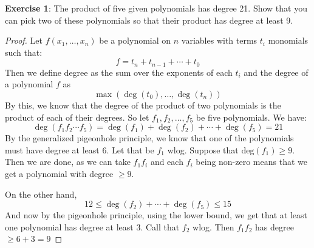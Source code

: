 \documentclass{article}
\begin{document}
\textbf{Exercise 1}: The product of five given polynomials has degree 21. Show that you can pick two of these polynomials so that their product has degree at least 9.
    \begin{proof}
        Let $f(x_{1}, \ldots , x_{n})$ be a polynomial on $n$ variables with terms $t_{i}$ monomials such that:
            \begin{equation*}
                f = t_{n} + t_{n - 1} + \cdots +t_{0}
            \end{equation*}
        Then we define degree as the sum over the exponents of each $t_{i}$ and the degree of a polynomial $f$ as
            \begin{equation*}
                \max(\mathop{deg}(t_{0}), \ldots , \mathop{deg}(t_{n}))
            \end{equation*}
        By this, we know that the degree of the product of two polynomials is the product of each of their degrees. So let $f_{1}, f_{2}, \ldots , f_{5}$ be five polynomials. We have:
            \begin{equation*}
                \mathop{deg}(f_{1}f_{2}\cdots f_{5}) = \mathop{deg}(f_{1}) + \mathop{deg}(f_{2})  + \cdots + \mathop{deg}(f_{5}) = 21
            \end{equation*}
        By the generalized pigeonhole principle, we know that one of the polynomials must have degree at least $6$. Let that be $f_{1}$ wlog. Suppose that $\text{deg}(f_{1}) \geq 9$. Then we are done, as we can take $f_{1}f_{i}$ and each $f_{i}$ being non-zero means that we get a polynomial with degree $\geq 9$. 

        On the other hand, 
            \begin{equation*}
                12 \leq \mathop{deg}(f_{2}) + \cdots + \mathop{deg}(f_{5}) \leq 15
            \end{equation*}
        And now by the pigeonhole principle, using the lower bound, we get that at least one polynomial has degree at least $3$. Call that $f_{2}$ wlog. Then $f_{1}f_{2}$ has degree $\geq 6 + 3 = 9$
    \end{proof}
\end{document}
